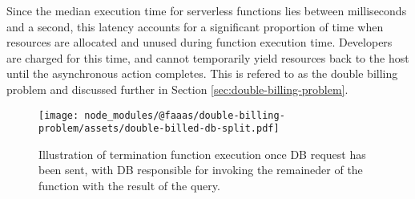 Since the median execution time for serverless functions lies between milliseconds and a second\cite{eismannReviewServerlessUse2020}, this latency accounts for a significant proportion of time when resources are allocated and unused during function execution time. Developers are charged for this time, and cannot temporarily yield resources back to the host until the asynchronous action completes. This is refered to as the double billing problem\cite{baldiniServerlessTrilemmaFunction2017,yuCharacterizingServerlessPlatforms2020} and discussed further in Section \ref{sec:double-billing-problem}.

\begin{figure}[t]
    \texttt{[image: node\_modules/@faaas/double-billing-problem/assets/double-billed-db-split.pdf]}
    \caption{Illustration of termination function execution once DB request has been sent, with DB responsible for invoking the remaineder of the function with the result of the query.}
    \label{fig:double-billing-db-split}
\end{figure}
